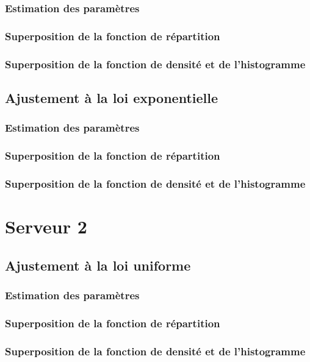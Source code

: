 \documentclass{article}
\begin{document}
\subsubsection{Estimation des paramètres}
\subsubsection{Superposition de la fonction de répartition}
\subsubsection{Superposition de la fonction de densité et de l'histogramme}

\subsection {Ajustement à la loi exponentielle}

\subsubsection{Estimation des paramètres}
\subsubsection{Superposition de la fonction de répartition}
\subsubsection{Superposition de la fonction de densité et de l'histogramme}

\section{Serveur 2}

\subsection{Ajustement à la loi uniforme}

\subsubsection{Estimation des paramètres}
\subsubsection{Superposition de la fonction de répartition}
\subsubsection{Superposition de la fonction de densité et de l'histogramme}
\end{document}
